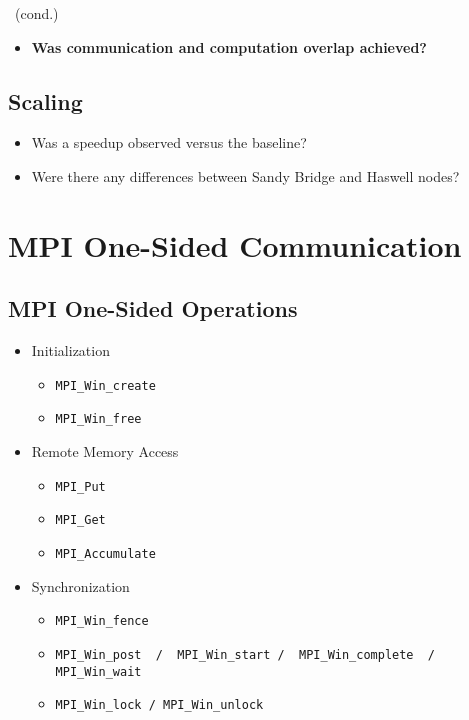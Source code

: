 \documentclass[9pt,pdftex]{beamer}
\begin{document}
\begin{frame}{\insertsubsection \ (cond.)}
\begin{itemize}
\item \textbf{Was communication and computation overlap achieved?}
\end{itemize}
\end{frame}

\subsection{Scaling}
\begin{frame}{\insertsubsection}
\begin{itemize}
\item Was a speedup observed versus the baseline?
\item Were there any differences between Sandy Bridge and Haswell nodes?
\end{itemize}
\end{frame}

\section{MPI One-Sided Communication}
\begin{frame}{\phantom{Contents}}
\tableofcontents[
  currentsection  
]
\end{frame}
\subsection{MPI One-Sided Operations}
\begin{frame}{\insertsubsection}
\begin{itemize}
	\item Initialization
	\begin{itemize}
		\item \lstinline[basicstyle=\scriptsize\bf]{MPI_Win_create}
		\item \lstinline[basicstyle=\scriptsize\bf]{MPI_Win_free}
	\end{itemize}
	
	\item Remote Memory Access
	\begin{itemize}
		\item \lstinline[basicstyle=\scriptsize\bf]{MPI_Put}
		\item \lstinline[basicstyle=\scriptsize]{MPI_Get}
		\item \lstinline[basicstyle=\scriptsize]{MPI_Accumulate}                 
	\end{itemize}

	\item Synchronization
	\begin{itemize}
		\item \lstinline[basicstyle=\scriptsize\bf]{MPI_Win_fence}
		\item \lstinline[basicstyle=\scriptsize]{MPI_Win_post  /  MPI_Win_start /  MPI_Win_complete  / MPI_Win_wait}
		\item \lstinline[basicstyle=\scriptsize]{MPI_Win_lock / MPI_Win_unlock}
	\end{itemize}
\end{itemize}
\end{frame}
\end{document}

